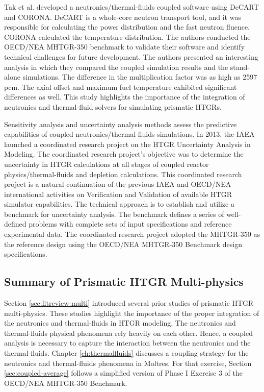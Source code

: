 Tak et al. \cite{tak_coupled_2016} developed a neutronics/thermal-fluids coupled software using DeCART \cite{kaeri_decart_2007} and CORONA.
DeCART is a whole-core neutron transport tool, and it was responsible for calculating the power distribution and the fast neutron fluence.
CORONA calculated the temperature distribution.
The authors conducted the OECD/NEA MHTGR-350 benchmark to validate their software and identify technical challenges for future development.
The authors presented an interesting analysis in which they compared the coupled simulation results and the stand-alone simulations.
The difference in the multiplication factor was as high as 2597 pcm.
The axial offset and maximum fuel temperature exhibited significant differences as well.
This study highlights the importance of the integration of neutronics and thermal-fluid solvers for simulating prismatic HTGRs.

Sensitivity analysis and uncertainty analysis methods assess the predictive capabilities of coupled neutronics/thermal-fluids simulations.
In 2013, the IAEA launched a coordinated research project \cite{tyobeka_htgr_2011} on the HTGR Uncertainty Analysis in Modeling.
The coordinated research project's objective was to determine the uncertainty in HTGR calculations at all stages of coupled reactor physics/thermal-fluids and depletion calculations.
This coordinated research project is a natural continuation of the previous IAEA and OECD/NEA international activities \cite{iaea_evaluation_2003}\cite{reitsma_oecd-neansc_2008} on Verification and Validation of available HTGR simulator capabilities.
The technical approach is to establish and utilize a benchmark for uncertainty analysis.
The benchmark defines a series of well-defined problems with complete sets of input specifications and reference experimental data.
The coordinated research project adopted the MHTGR-350 as the reference design using the OECD/NEA MHTGR-350 Benchmark \cite{oecd_nea_benchmark_2017} design specifications.

\subsection{Summary of Prismatic HTGR Multi-physics}

Section \ref{sec:litreview-multi} introduced several prior studies of prismatic HTGR multi-physics.
These studies highlight the importance of the proper integration of the neutronics and thermal-fluids in HTGR modeling.
The neutronics and thermal-fluids physical phenomena rely heavily on each other.
Hence, a coupled analysis is necessary to capture the interaction between the neutronics and the thermal-fluids.
Chapter \ref{ch:thermalfluids} discusses a coupling strategy for the neutronics and thermal-fluids phenomena in Moltres.
For that exercise, Section \ref{sec:coupled-average} follows a simplified version of Phase I Exercise 3 of the OECD/NEA MHTGR-350 Benchmark.
